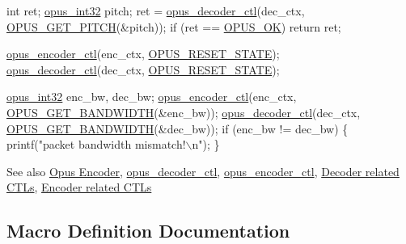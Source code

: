 \begin{DoxyCode}
\textcolor{keywordtype}{int} ret;
\hyperlink{opus__types_8h_aa4d309d6f80b99dbabebc8f98879ab9a}{opus\_int32} pitch;
ret = \hyperlink{group__opus__decoder_gae70051dd19b78e25241bb6ca9a222f12}{opus\_decoder\_ctl}(dec\_ctx, \hyperlink{group__opus__decoderctls_gaa89fc25eb35fc31a02b508562dd83820}{OPUS\_GET\_PITCH}(&pitch));
\textcolor{keywordflow}{if} (ret == \hyperlink{group__opus__errorcodes_gaa44cf8a185e1b5cb940ef63eb4f02d21}{OPUS\_OK}) \textcolor{keywordflow}{return} ret;

\hyperlink{group__opus__encoder_ga88cb327d8f7d6a96c7d2d0b8461512e6}{opus\_encoder\_ctl}(enc\_ctx, \hyperlink{group__opus__genericctls_gadc74e4fa8bcdf9994187d52d92207337}{OPUS\_RESET\_STATE});
\hyperlink{group__opus__decoder_gae70051dd19b78e25241bb6ca9a222f12}{opus\_decoder\_ctl}(dec\_ctx, \hyperlink{group__opus__genericctls_gadc74e4fa8bcdf9994187d52d92207337}{OPUS\_RESET\_STATE});

\hyperlink{opus__types_8h_aa4d309d6f80b99dbabebc8f98879ab9a}{opus\_int32} enc\_bw, dec\_bw;
\hyperlink{group__opus__encoder_ga88cb327d8f7d6a96c7d2d0b8461512e6}{opus\_encoder\_ctl}(enc\_ctx, \hyperlink{group__opus__genericctls_ga29db1d9b5e670debec54d1163ad2ec62}{OPUS\_GET\_BANDWIDTH}(&enc\_bw));
\hyperlink{group__opus__decoder_gae70051dd19b78e25241bb6ca9a222f12}{opus\_decoder\_ctl}(dec\_ctx, \hyperlink{group__opus__genericctls_ga29db1d9b5e670debec54d1163ad2ec62}{OPUS\_GET\_BANDWIDTH}(&dec\_bw));
\textcolor{keywordflow}{if} (enc\_bw != dec\_bw) \{
  printf(\textcolor{stringliteral}{"packet bandwidth mismatch!\(\backslash\)n"});
\}
\end{DoxyCode}


\begin{DoxySeeAlso}{See also}
\hyperlink{group__opus__encoder}{Opus Encoder}, \hyperlink{group__opus__decoder_gae70051dd19b78e25241bb6ca9a222f12}{opus\+\_\+decoder\+\_\+ctl}, \hyperlink{group__opus__encoder_ga88cb327d8f7d6a96c7d2d0b8461512e6}{opus\+\_\+encoder\+\_\+ctl}, \hyperlink{group__opus__decoderctls}{Decoder related C\+T\+Ls}, \hyperlink{group__opus__encoderctls}{Encoder related C\+T\+Ls} 
\end{DoxySeeAlso}


\subsection{Macro Definition Documentation}
\mbox{\label{group__opus__genericctls_ga29db1d9b5e670debec54d1163ad2ec62}} 
